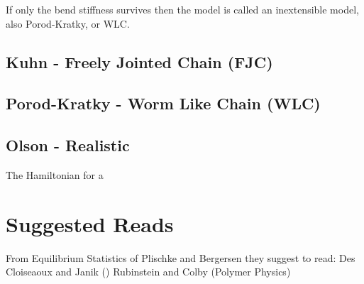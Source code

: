 If only the bend stiffness survives then the model is called an
inextensible model, also Porod-Kratky, or WLC.

\subsection{Kuhn - Freely Jointed Chain (FJC)}

\subsection{Porod-Kratky - Worm Like Chain (WLC)}

\subsection{Olson - Realistic}

The Hamiltonian for a \cite{czapla2009}





\section{Suggested Reads}

From Equilibrium Statistics of Plischke and Bergersen they suggest to
read:
Des Cloiseaoux and Janik ()
Rubinstein and Colby (Polymer Physics)

